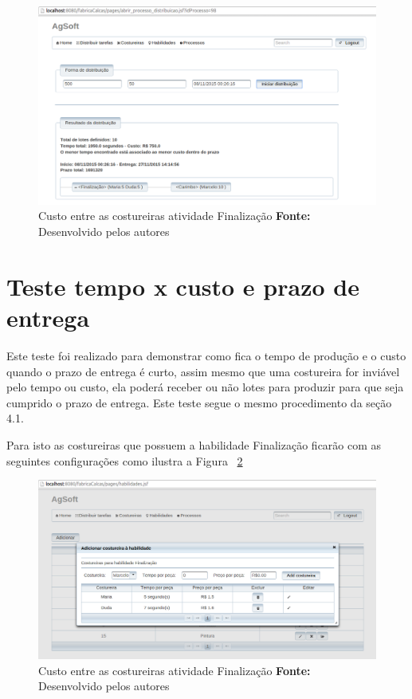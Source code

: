 \begin{figure}[h!]
	\centerline{\includegraphics[scale=0.4]{./imagens/resultado_tudo_igual_teste2.png}}
	\caption[Custo entre as costureiras atividade Finalização]
	{Custo entre as costureiras atividade Finalização \textbf{Fonte:} Desenvolvido pelos autores}
	\label{fig:resultado_tudo_igual}
\end{figure}

\section{Teste tempo x custo e prazo de entrega}

\par Este teste foi realizado para demonstrar como fica o tempo de
produção e o custo quando o prazo de entrega é curto,
assim mesmo que uma costureira for inviável pelo tempo ou custo, ela poderá
receber ou não lotes para produzir para que seja cumprido o prazo de entrega.
Este teste segue o mesmo procedimento da seção 4.1.

\par Para isto as costureiras que possuem a habilidade Finalização ficarão com
as seguintes configurações como ilustra a Figura
~\ref{fig:configuracao_habilidade_costureira_teste3}

\newpage

\begin{figure}[h!]
	\centerline{\includegraphics[scale=0.4]{./imagens/cofiguracao_habilidade_teste3.png}}
	\caption[Custo entre as costureiras atividade Finalização]
	{Custo entre as costureiras atividade Finalização \textbf{Fonte:} Desenvolvido pelos autores}
	\label{fig:configuracao_habilidade_costureira_teste3}
\end{figure}


